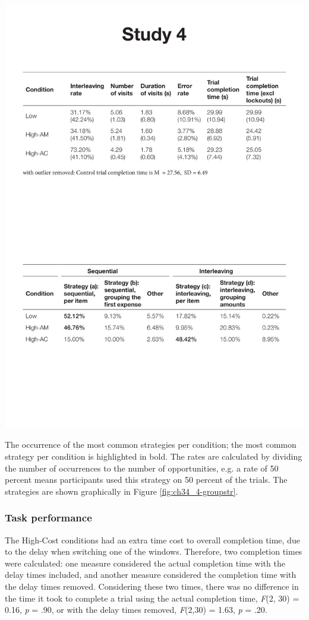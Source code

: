 \begin{table}[!ht]
  \centering
    \includegraphics[width=\textwidth]{images/ch34/ch4_4-StrategyFreq.pdf}
\caption[Study 4 occurrence of most common strategies]{The occurrence of the most common strategies per condition; the most common strategy per condition is highlighted in bold. The rates are calculated by dividing the number of occurrences to the number of opportunities, e.g. a  rate of 50 percent means participants used this strategy on 50 percent of the trials. The strategies are shown graphically in Figure \ref{fig:ch34_4-groupstr}.}
          \label{tbl:ch34_4-groupstr}
\end{table}

\subsubsection{Task performance}
The High-Cost conditions had an extra time cost to overall completion time, due to the delay when switching one of the windows. Therefore, two completion times were calculated: one measure considered the actual completion time with the delay times included, and another measure considered the completion time with the delay times removed. Considering these two times, there was no difference in the time it took to complete a trial using the actual completion time,  \textit{F}(2, 30) = 0.16, \textit{p} = .90, or with the delay times removed, \textit{F}(2,30) = 1.63, \textit{p} = .20.

